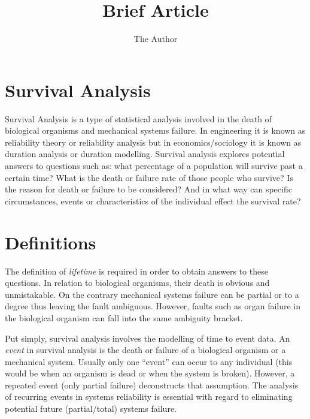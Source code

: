 \documentclass[11pt]{article} %
\title{Brief Article}
\author{The Author}
\begin{document}
\maketitle

\begin{abstract}

\end{abstract}
\tableofcontents

\section{Survival Analysis}
Survival Analysis is a type of statistical analysis involved in the death of biological organisms and mechanical systems failure. In engineering it is known as reliability theory or reliability analysis but in economics/sociology it is known as duration analysis or duration modelling. Survival analysis explores potential answers to questions such as: what percentage of a population will survive past a certain time? What is the death or failure rate of those people who survive? Is the reason for death or failure to be considered? And in what way can specific circumstances, events or characteristics of the individual effect the survival rate?

\section{Definitions}
The definition of \textit{lifetime} is required in order to obtain answers to these questions. In relation to biological organisms, their death is obvious and unmistakable. On the contrary mechanical systems failure can be partial or to a degree thus leaving the fault ambiguous. However, faults such as organ failure in the biological organism can fall into the same ambiguity bracket. 

Put simply, survival analysis involves the modelling of time to event data. An \textit{event} in survival analysis is the death or failure of a biological organism or a mechanical system. Usually only one “event” can occur to any individual (this would be when an organism is dead or when the system is broken). However, a repeated event (only partial failure) deconstructs that assumption. The analysis of recurring events in systems reliability is essential with regard to eliminating potential future (partial/total) systems failure.
\end{document}
